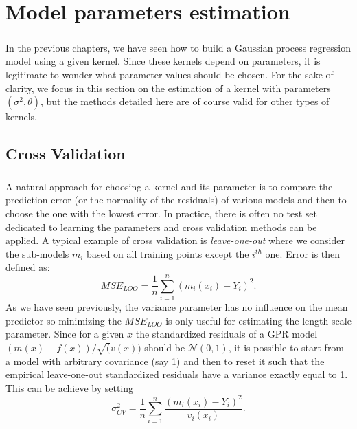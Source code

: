 \documentclass[twoside,openright]{report}
\begin{document}
\chapter{Model parameters estimation}
\paragraph{}
In the previous chapters, we have seen how to build a Gaussian process regression model using a given kernel. Since these kernels depend on parameters, it is legitimate to wonder what parameter values should be chosen. For the sake of clarity, we focus in this section on the estimation of a kernel with parameters $(\sigma^2,\theta)$, but the methods detailed here are of course valid for other types of kernels.

\section{Cross Validation} 
\paragraph{}
A natural approach for choosing a kernel and its parameter is to compare the prediction error (or the normality of the residuals) of various models and then to choose the one with the lowest error. In practice, there is often no test set dedicated to learning the parameters and cross validation methods can be applied. A typical example of cross validation is \emph{leave-one-out} where we consider the sub-models $m_i$ based on all training points except the $i^{th}$ one. Error is then defined as:
\begin{equation}
MSE_{LOO} = \frac{1}{n} \sum_{i=1}^n (m_i(x_i) - Y_i)^2.
\end{equation}
As we have seen previously, the variance parameter has no influence on the mean predictor so minimizing the $MSE_{LOO}$ is only useful for estimating the length scale parameter. Since for a given $x$ the standardized residuals of a GPR model $(m(x)-f(x))/\sqrt(v(x))$ should be $\mathcal{N}(0,1)$, it is possible to start from a model with arbitrary covariance (say 1) and then to reset it such that the empirical leave-one-out standardized residuals have a variance exactly equal to 1. This can be achieve by setting
\begin{equation}
 \sigma^2_{CV} = \frac{1}{n} \sum_{i=1}^n \frac{(m_i(x_i) - Y_i)^2}{v_i(x_i)}.
\end{equation}
\end{document}
